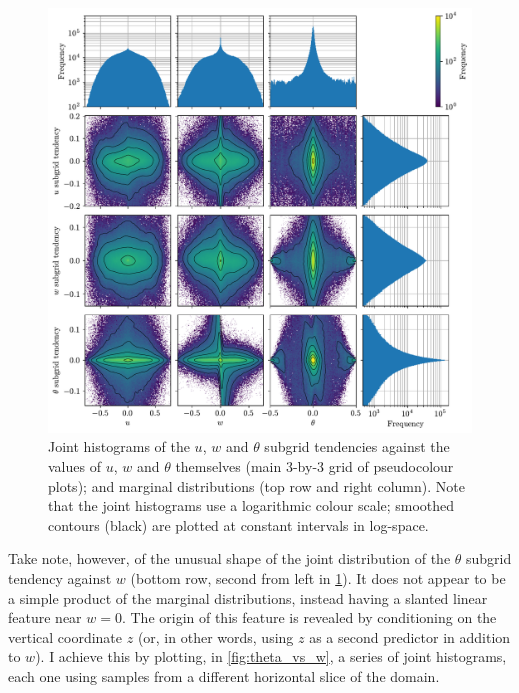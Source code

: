 \documentclass[../main.tex]{subfiles}
\begin{document}
\begin{figure}[ht]
    \centering
    \includegraphics[width=\linewidth]{figures/subgrid_vs_vars.pdf}
    \caption{
        Joint histograms of the $u$, $w$ and $\theta$ subgrid tendencies
        against the values of $u$, $w$ and $\theta$ themselves (main 3-by-3
        grid of pseudocolour plots); and marginal distributions (top row and
        right column). Note that the joint histograms use a logarithmic
        colour scale; smoothed contours (black) are plotted at constant
        intervals in log-space.
    }
    \label{fig:subgrid_vs_vars}
\end{figure}

Take note, however, of the unusual shape of the joint distribution of the
$\theta$ subgrid tendency against $w$ (bottom row, second from left in
\cref{fig:subgrid_vs_vars}). It does not appear to be a simple product of the
marginal distributions, instead having a slanted linear feature near $w=0$.
The origin of this feature is revealed by conditioning on the vertical
coordinate $z$ (or, in other words, using $z$ as a second predictor in
addition to $w$). I achieve this by plotting, in \cref{fig:theta_vs_w},
a series of joint histograms, each one using samples from a different
horizontal slice of the domain.
\end{document}

